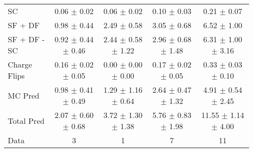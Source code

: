\begin{tabular}{l|cccc}
                                 SC &  0.06 $\pm$  0.02 &  0.06 $\pm$  0.02 &  0.10 $\pm$  0.03 &  0.21 $\pm$  0.07 \\
                            SF + DF &  0.98 $\pm$  0.44 &  2.49 $\pm$  0.58 &  3.05 $\pm$  0.68 &  6.52 $\pm$  1.00 \\
\hline
                       SF + DF - SC &  0.92 $\pm$  0.44 $\pm$  0.46 &  2.44 $\pm$  0.58 $\pm$  1.22 &  2.96 $\pm$  0.68 $\pm$  1.48 &  6.31 $\pm$  1.00 $\pm$  3.16 \\
\hline\hline
                       Charge Flips &  0.16 $\pm$  0.02 $\pm$  0.05 &  0.00 $\pm$  0.00 $\pm$  0.00 &  0.17 $\pm$  0.02 $\pm$  0.05 &  0.33 $\pm$  0.03 $\pm$  0.10 \\
\hline
                            MC Pred &  0.98 $\pm$  0.41 $\pm$  0.49 &  1.29 $\pm$  1.16 $\pm$  0.64 &  2.64 $\pm$  0.47 $\pm$  1.32 &  4.91 $\pm$  0.54 $\pm$  2.45 \\
\hline
                         Total Pred &  2.07 $\pm$  0.60 $\pm$  0.68 &  3.72 $\pm$  1.30 $\pm$  1.38 &  5.76 $\pm$  0.83 $\pm$  1.98 & 11.55 $\pm$  1.14 $\pm$  4.00 \\
\hline\hline
                               Data &     3 &     1 &     7 &    11 \\
\hline\hline
\end{tabular}

